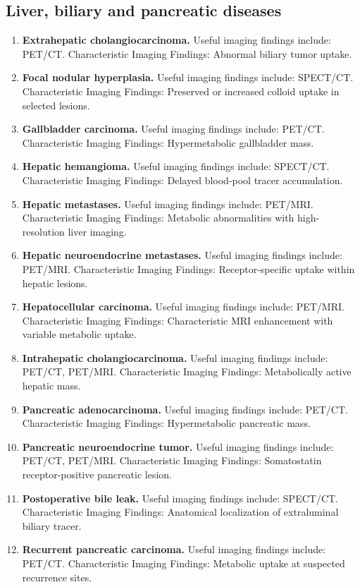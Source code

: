 \subsection{Liver, biliary and pancreatic diseases}
\begin{enumerate}[leftmargin=*,itemsep=0.45em,topsep=0.4em]
\item \textbf{Extrahepatic cholangiocarcinoma.} Useful imaging findings include: PET/CT. Characteristic Imaging Findings: Abnormal biliary tumor uptake.
\item \textbf{Focal nodular hyperplasia.} Useful imaging findings include: SPECT/CT. Characteristic Imaging Findings: Preserved or increased colloid uptake in selected lesions.
\item \textbf{Gallbladder carcinoma.} Useful imaging findings include: PET/CT. Characteristic Imaging Findings: Hypermetabolic gallbladder mass.
\item \textbf{Hepatic hemangioma.} Useful imaging findings include: SPECT/CT. Characteristic Imaging Findings: Delayed blood-pool tracer accumulation.
\item \textbf{Hepatic metastases.} Useful imaging findings include: PET/MRI. Characteristic Imaging Findings: Metabolic abnormalities with high-resolution liver imaging.
\item \textbf{Hepatic neuroendocrine metastases.} Useful imaging findings include: PET/MRI. Characteristic Imaging Findings: Receptor-specific uptake within hepatic lesions.
\item \textbf{Hepatocellular carcinoma.} Useful imaging findings include: PET/MRI. Characteristic Imaging Findings: Characteristic MRI enhancement with variable metabolic uptake.
\item \textbf{Intrahepatic cholangiocarcinoma.} Useful imaging findings include: PET/CT, PET/MRI. Characteristic Imaging Findings: Metabolically active hepatic mass.
\item \textbf{Pancreatic adenocarcinoma.} Useful imaging findings include: PET/CT. Characteristic Imaging Findings: Hypermetabolic pancreatic mass.
\item \textbf{Pancreatic neuroendocrine tumor.} Useful imaging findings include: PET/CT, PET/MRI. Characteristic Imaging Findings: Somatostatin receptor-positive pancreatic lesion.
\item \textbf{Postoperative bile leak.} Useful imaging findings include: SPECT/CT. Characteristic Imaging Findings: Anatomical localization of extraluminal biliary tracer.
\item \textbf{Recurrent pancreatic carcinoma.} Useful imaging findings include: PET/CT. Characteristic Imaging Findings: Metabolic uptake at suspected recurrence sites.
\end{enumerate}

